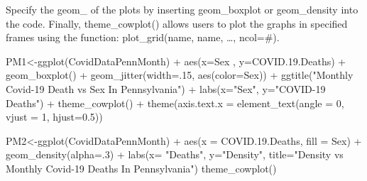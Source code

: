 \documentclass[
]{article}
\newenvironment{Shaded}{\begin{snugshade}}{\end{snugshade}}
\newcommand{\AttributeTok}[1]{\textcolor[rgb]{0.77,0.63,0.00}{#1}}
\newcommand{\DecValTok}[1]{\textcolor[rgb]{0.00,0.00,0.81}{#1}}
\newcommand{\FloatTok}[1]{\textcolor[rgb]{0.00,0.00,0.81}{#1}}
\newcommand{\FunctionTok}[1]{\textcolor[rgb]{0.00,0.00,0.00}{#1}}
\newcommand{\NormalTok}[1]{#1}
\newcommand{\OtherTok}[1]{\textcolor[rgb]{0.56,0.35,0.01}{#1}}
\newcommand{\SpecialCharTok}[1]{\textcolor[rgb]{0.00,0.00,0.00}{#1}}
\newcommand{\StringTok}[1]{\textcolor[rgb]{0.31,0.60,0.02}{#1}}
\begin{document}
Specify the geom\_ of the plots by inserting geom\_boxplot or
geom\_density into the code. Finally, theme\_cowplot() allows users to
plot the graphs in specified frames using the function: plot\_grid(name,
name, \ldots, ncol=\#).

\begin{Shaded}
\begin{Highlighting}[]
\NormalTok{PM1}\OtherTok{\textless{}{-}}\FunctionTok{ggplot}\NormalTok{(CovidDataPennMonth) }\SpecialCharTok{+}
  \FunctionTok{aes}\NormalTok{(}\AttributeTok{x=}\NormalTok{Sex , }\AttributeTok{y=}\NormalTok{COVID.}\FloatTok{19.}\NormalTok{Deaths) }\SpecialCharTok{+}
  \FunctionTok{geom\_boxplot}\NormalTok{() }\SpecialCharTok{+}
  \FunctionTok{geom\_jitter}\NormalTok{(}\AttributeTok{width=}\NormalTok{.}\DecValTok{15}\NormalTok{, }\FunctionTok{aes}\NormalTok{(}\AttributeTok{color=}\NormalTok{Sex)) }\SpecialCharTok{+}
  \FunctionTok{ggtitle}\NormalTok{(}\StringTok{"Monthly Covid{-}19 Death vs Sex In Pennsylvania"}\NormalTok{) }\SpecialCharTok{+}
  \FunctionTok{labs}\NormalTok{(}\AttributeTok{x=}\StringTok{"Sex"}\NormalTok{, }\AttributeTok{y=}\StringTok{"COVID{-}19 Deaths"}\NormalTok{) }\SpecialCharTok{+}
  \FunctionTok{theme\_cowplot}\NormalTok{() }\SpecialCharTok{+}
  \FunctionTok{theme}\NormalTok{(}\AttributeTok{axis.text.x =} \FunctionTok{element\_text}\NormalTok{(}\AttributeTok{angle =} \DecValTok{0}\NormalTok{, }\AttributeTok{vjust =} \DecValTok{1}\NormalTok{, }\AttributeTok{hjust=}\FloatTok{0.5}\NormalTok{))}
  
\NormalTok{PM2}\OtherTok{\textless{}{-}}\FunctionTok{ggplot}\NormalTok{(CovidDataPennMonth) }\SpecialCharTok{+}
  \FunctionTok{aes}\NormalTok{(}\AttributeTok{x =}\NormalTok{ COVID.}\FloatTok{19.}\NormalTok{Deaths, }\AttributeTok{fill =}\NormalTok{ Sex) }\SpecialCharTok{+} 
  \FunctionTok{geom\_density}\NormalTok{(}\AttributeTok{alpha=}\NormalTok{.}\DecValTok{3}\NormalTok{) }\SpecialCharTok{+}
  \FunctionTok{labs}\NormalTok{(}\AttributeTok{x=} \StringTok{"Deaths"}\NormalTok{, }\AttributeTok{y=}\StringTok{"Density"}\NormalTok{, }\AttributeTok{title=}\StringTok{"Density vs Monthly Covid{-}19 Deaths In Pennsylvania"}\NormalTok{)}
  \FunctionTok{theme\_cowplot}\NormalTok{()}
\end{Highlighting}
\end{Shaded}
\end{document}
